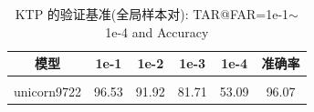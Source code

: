 \documentclass[a4paper, 11pt, UTF8]{ctexart}%
\begin{document}
\begin{table}[h]
\caption{KTP 的验证基准(全局样本对): TAR@FAR=1e-1$\sim$ 1e-4 and Accuracy}
\label{table:KTP-GP}
\begin{center}
\begin{tabular}{cccccc}
\multicolumn{1}{c}{\bf 模型}  &\multicolumn{1}{c}{\bf 1e-1} &\multicolumn{1}{c}{\bf 1e-2} &\multicolumn{1}{c}{\bf 1e-3} &\multicolumn{1}{c}{\bf 1e-4}&\multicolumn{1}{c}{\bf 准确率}
\\ \hline \\
unicorn9722 &  96.53 & 91.92 & 81.71 & 53.09 & 96.07 \\
\end{tabular}
\end{center}
\end{table}
%
%
%
%
\end{document}
